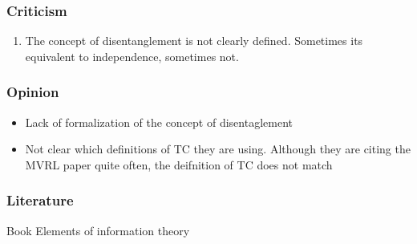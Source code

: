 \documentclass{beamer}
\theoremstyle{definition}
\begin{document}
    \begin{frame}
      \frametitle{Criticism}
      \begin{enumerate}
              \item The concept of disentanglement is not clearly defined. Sometimes its equivalent to independence, sometimes not.
      \end{enumerate}
    \end{frame}


    \begin{frame}
      \frametitle{Opinion}
      \begin{itemize}
        \item Lack of formalization of the concept of disentaglement
        \item Not clear which definitions of TC they are using. Although they are citing the MVRL paper quite often, the deifnition of TC does not match



      \end{itemize}

    \end{frame}


    \begin{frame}
      \frametitle{Literature}
      Book Elements of information theory
    \end{frame}


   
\end{document}
